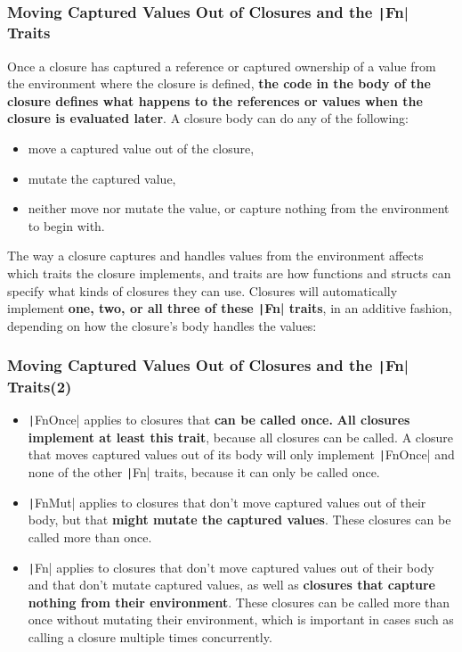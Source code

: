 \documentclass{beamer}
\begin{document}
\begin{frame}[fragile]
	\frametitle{Moving Captured Values Out of Closures and the \texttt|Fn| Traits}
	Once a closure has captured a reference or captured ownership of a value from the environment where the closure is defined, \textbf{the code in the body of the closure defines what happens to the references or values when the closure is evaluated later}. A closure body can do any of the following: 
	\begin{itemize}
		\item move a captured value out of the closure, 
		\item mutate the captured value, 
		\item neither move nor mutate the value, or capture nothing from the environment to begin with.
	\end{itemize}

The way a closure captures and handles values from the environment affects which traits the closure implements, and traits are how functions and structs can specify what kinds of closures they can use. Closures will automatically implement\textbf{ one, two, or all three of these \texttt|Fn|  traits}, in an additive fashion, depending on how the closure’s body handles the values:
\end{frame}


\begin{frame}[fragile]
	\frametitle{Moving Captured Values Out of Closures and the \texttt|Fn| Traits(2)}
	\begin{itemize}
		\item \texttt|FnOnce| applies to closures that \textbf{can be called once.} \textbf{All closures implement at least this trait}, because all closures can be called. A closure that moves captured values out of its body will only implement \texttt|FnOnce| and none of the other \texttt|Fn| traits, because it can only be called once.
		\item  \texttt|FnMut| applies to closures that don’t move captured values out of their body, but that \textbf{might mutate the captured values}. These closures can be called more than once.
		\item 	\texttt|Fn| applies to closures that don’t move captured values out of their body and that don’t mutate captured values, as well as \textbf{closures that capture nothing from their environment}. These closures can be called more than once without mutating their environment, which is important in cases such as calling a closure multiple times concurrently.
	\end{itemize}
\end{frame}
\end{document}
